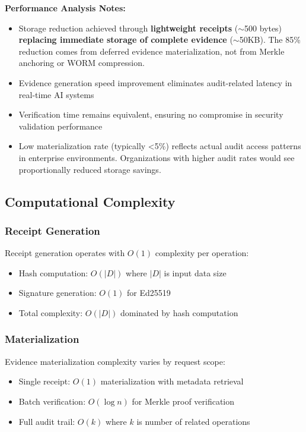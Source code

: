 \documentclass[12pt,a4paper]{article}
\begin{document}
\textbf{Performance Analysis Notes:}
\begin{itemize}
\item Storage reduction achieved through \textbf{lightweight receipts} ($\sim$500 bytes) \textbf{replacing immediate storage of complete evidence} ($\sim$50KB). The 85\% reduction comes from deferred evidence materialization, not from Merkle anchoring or WORM compression.
\item Evidence generation speed improvement eliminates audit-related latency in real-time AI systems
\item Verification time remains equivalent, ensuring no compromise in security validation performance
\item Low materialization rate (typically <5\%) reflects actual audit access patterns in enterprise environments. Organizations with higher audit rates would see proportionally reduced storage savings.
\end{itemize}

\subsection{Computational Complexity}

\subsubsection{Receipt Generation}

Receipt generation operates with $O(1)$ complexity per operation:

\begin{itemize}
\item Hash computation: $O(|D|)$ where $|D|$ is input data size
\item Signature generation: $O(1)$ for Ed25519
\item Total complexity: $O(|D|)$ dominated by hash computation
\end{itemize}

\subsubsection{Materialization}

Evidence materialization complexity varies by request scope:

\begin{itemize}
\item Single receipt: $O(1)$ materialization with metadata retrieval
\item Batch verification: $O(\log n)$ for Merkle proof verification
\item Full audit trail: $O(k)$ where $k$ is number of related operations
\end{itemize}
\end{document}
